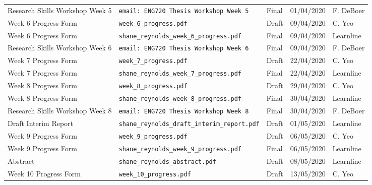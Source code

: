 \documentclass[10pt, landscape]{article}
\begin{document}
\begin{longtable}{p{7cm}p{10cm}p{1.5cm}p{2cm}p{2cm}}
	Research Skills Workshop Week 5					& \verb|email: ENG720 Thesis Workshop Week 5|								& Final				& 01/04/2020		 	& F. DeBoer\\
	
	Week 6 Progress Form							& \verb|week_6_progress.pdf|												& Draft				& 09/04/2020			& C. Yeo\\
	
	Week 6 Progress Form							& \verb|shane_reynolds_week_6_progress.pdf|									& Final				& 09/04/2020			& Learnline\\
	
	Research Skills Workshop Week 6					& \verb|email: ENG720 Thesis Workshop Week 6|								& Final				& 09/04/2020		 	& F. DeBoer\\
	
	Week 7 Progress Form							& \verb|week_7_progress.pdf|												& Draft				& 22/04/2020			& C. Yeo\\
		
	Week 7 Progress Form							& \verb|shane_reynolds_week_7_progress.pdf|									& Final				& 22/04/2020			& Learnline\\
	
	Week 8 Progress Form							& \verb|week_8_progress.pdf|												& Draft				& 29/04/2020			& C. Yeo\\
			
	Week 8 Progress Form							& \verb|shane_reynolds_week_8_progress.pdf|									& Final				& 30/04/2020			& Learnline\\
	
	Research Skills Workshop Week 8					& \verb|email: ENG720 Thesis Workshop Week 8|								& Final				& 30/04/2020		 	& F. DeBoer\\
	
	Draft Interim Report							& \verb|shane_reynolds_draft_interim_report.pdf|							& Draft				& 01/05/2020			& Learnline\\
	
	Week 9 Progress Form							& \verb|week_9_progress.pdf|												& Draft				& 06/05/2020			& C. Yeo\\
				
	Week 9 Progress Form							& \verb|shane_reynolds_week_9_progress.pdf|									& Final				& 06/05/2020			& Learnline\\
	
	Abstract										& \verb|shane_reynolds_abstract.pdf|										& Draft				& 08/05/2020			& Learnline\\ 
	
	Week 10 Progress Form							& \verb|week_10_progress.pdf|												& Draft				& 13/05/2020			& C. Yeo\\
					

\end{longtable}
\end{document}
